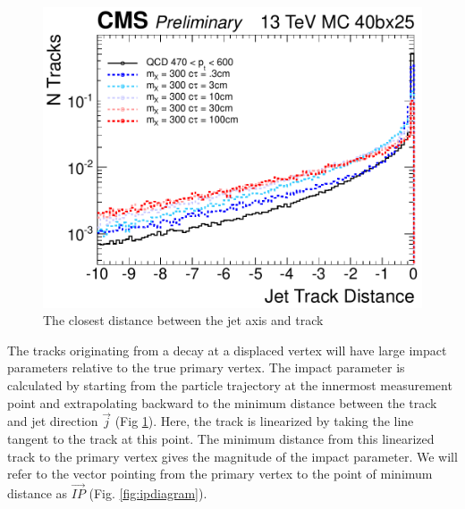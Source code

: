\begin{figure}
\begin{center}
\includegraphics[width=.7\textwidth]{figures/an_jetid/VTX_MATCH_IP/liTrackDistanceJetAxis}
\end{center}
\caption{The closest distance between the jet axis and track}
\label{fig:distance}
\end{figure}

The tracks originating from a decay at a displaced vertex will have large impact parameters relative
to the true primary vertex. The impact parameter is calculated by starting from the particle trajectory at the
innermost measurement point and extrapolating backward to the minimum distance between the track and jet direction $\vec{j}$ (Fig \ref{fig:distance}).
Here, the track is linearized by taking the line tangent to the track at this point. The minimum distance from this linearized
track to the primary vertex gives the magnitude of the impact parameter. We will refer to the vector pointing from the
primary vertex to the point of minimum distance as $\vec{IP}$ (Fig. \ref{fig:ipdiagram}). 


